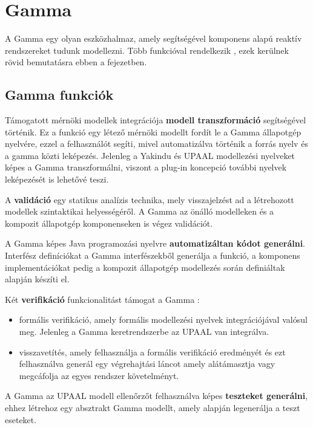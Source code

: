 \section{Gamma}

A Gamma egy olyan eszközhalmaz, amely segítségével komponens alapú reaktív rendszereket tudunk modellezni. Több funkcióval rendelkezik \cite{DBLP:journals/sosym/GraicsMVMV20}, ezek kerülnek rövid bemutatásra ebben a fejezetben.
\subsection{Gamma funkciók}
Támogatott mérnöki modellek integrációja \textbf{modell transzformáció}  segítségével történik. Ez a funkció egy létező mérnöki modellt fordít le a Gamma állapotgép nyelvére, ezzel a felhasználót segíti, mivel automatizálva történik a forrás nyelv és a gamma közti leképezés. Jelenleg a Yakindu és UPAAL modellezési nyelveket képes a Gamma transzformálni, viszont a plug-in koncepció további nyelvek leképezését is lehetővé teszi.

A \textbf{validáció} egy statikus analízis technika, mely visszajelzést ad a létrehozott modellek szintaktikai helyességéről. A Gamma az önálló modelleken és a kompozit állapotgép komponenseken is végez validációt.

A Gamma képes Java programozási nyelvre \textbf{automatizáltan kódot generálni}. Interfész definíciókat a Gamma interfészekből generálja a funkció, a komponens implementációkat pedig a kompozit állapotgép modellezés során definiáltak alapján készíti el.

Két \textbf{verifikáció} funkcionalitást támogat a Gamma :
\begin{itemize}
	\item formális verifikáció, amely formális modellezési nyelvek integrációjával valósul meg. Jelenleg a Gamma keretrendszerbe az UPAAL van integrálva.
	\item visszavetítés, amely felhasználja a formális verifikáció eredményét és ezt felhasználva  generál egy végrehajtási láncot amely alátámasztja vagy megcáfolja az egyes rendszer követelményt.
\end{itemize}

A Gamma az UPAAL modell ellenőrzőt felhasználva képes \textbf{teszteket generálni}, ehhez létrehoz egy absztrakt Gamma modellt, amely alapján legenerálja a teszt eseteket.

